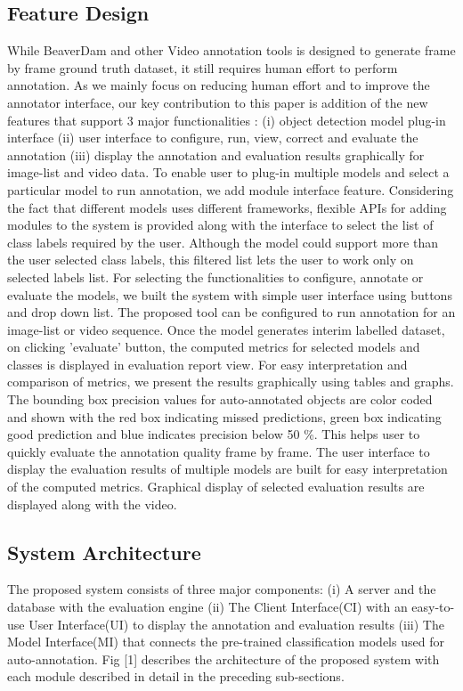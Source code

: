 \documentclass[conference]{IEEEtran}
\begin{document}
\subsection{Feature Design}
While BeaverDam\cite{dominguez2014gtgencv} and other Video annotation tools \cite{dominguez2014gtgencv} \cite{dominguez2014gtgencv}  is designed to generate frame by frame ground truth dataset, it still requires human effort to perform annotation. 
As we mainly focus on reducing human effort and to improve the annotator interface, our key contribution to this paper is addition of the new features that support 3 major functionalities : (i)  object detection model plug-in interface (ii) user interface to configure, run, view, correct and evaluate the annotation (iii) display the annotation and evaluation results graphically for image-list and video data.
To enable user to plug-in multiple models and select a particular model to run annotation, we add module interface feature.
Considering the fact that different models uses different frameworks, flexible APIs for adding modules to the system is provided along with the interface to select the list of class labels required by the user. Although the model could support more than the user selected class labels, this filtered list lets the user to work only on selected labels list. 
For selecting the functionalities to configure, annotate or evaluate the models, we built the system with simple user interface using buttons and drop down list. The proposed tool can be configured to run annotation for an image-list or video sequence.
Once the model generates interim labelled dataset, on clicking 'evaluate' button, the computed metrics for selected models and classes is displayed in evaluation report view. For easy interpretation and comparison of metrics, we present the results graphically using tables and graphs. 
The bounding box precision values for auto-annotated objects are color coded and shown with the red box indicating missed predictions, green box indicating good prediction and blue indicates precision below 50 \%. This helps user to quickly evaluate the annotation quality frame by frame. 
The user interface to display the evaluation results of multiple models are built for easy interpretation of the computed metrics. 
Graphical display of selected evaluation results are displayed along with the video.

\subsection{System Architecture}
The proposed system consists of three major components: (i) A server and the database with the evaluation engine (ii) The Client Interface(CI) with an easy-to-use User Interface(UI) to display the annotation and evaluation results (iii) The Model Interface(MI) that connects the pre-trained classification models used for auto-annotation. Fig [1]  describes the architecture of the proposed system with each module described in detail in the preceding sub-sections. 
\end{document}
